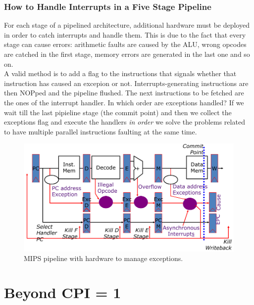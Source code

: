 \documentclass[10pt,a4paper]{article}
\begin{document}
		\section{How to Handle Interrupts in a Five Stage Pipeline}
			For each stage of a pipelined architecture, additional hardware must be deployed in order to catch interrupts and handle them. This is due to the fact that every stage can cause errors: arithmetic faults are caused by the ALU, wrong opcodes are catched in the first stage, memory errors are generated in the last one and so on.\\
			A valid method is to add a flag to the instructions that signals whether that instruction has caused an excepion or not. Interrupts-generating instructions are then NOPped and the pipeline flushed. The next instructions to be fetched are the ones of the interrupt handler. In which order are exceptions handled? If we wait till the last pipieline stage (the commit point) and then we collect the exceptions flag and execute the handlers \emph{in order} we solve the problems related to have multiple parallel instructions faulting at the same time.
			\begin{figure}[H]
				\centering
				\includegraphics[width = \textwidth]{./images/ExcMips.png}
				\caption{MIPS pipeline with hardware to manage exceptions.}
			\end{figure}

	\clearpage \part{Beyond CPI = 1}	
\end{document}
